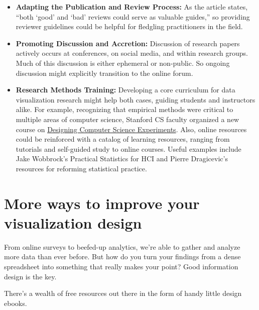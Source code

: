 \documentclass[]{book}
\providecommand{\tightlist}{%
  \setlength{\itemsep}{0pt}\setlength{\parskip}{0pt}}
\theoremstyle{definition}
\theoremstyle{definition}
\theoremstyle{definition}
\theoremstyle{remark}
\begin{document}
\begin{itemize}
\tightlist
\item
  \textbf{Adapting the Publication and Review Process:} As the article
  states, ``both `good' and `bad' reviews could serve as valuable
  guides,'' so providing reviewer guidelines could be helpful for
  fledgling practitioners in the field.
\item
  \textbf{Promoting Discussion and Accretion:} Discussion of research
  papers actively occurs at conferences, on social media, and within
  research groups. Much of this discussion is either ephemeral or
  non-public. So ongoing discussion might explicitly transition to the
  online forum.
\item
  \textbf{Research Methods Training:} Developing a core curriculum for
  data visualization research might help both cases, guiding students
  and instructors alike. For example, recognizing that empirical methods
  were critical to multiple areas of computer science, Stanford CS
  faculty organized a new course on
  \href{http://sing.stanford.edu/cs303-sp11/}{Designing Computer Science
  Experiments}. Also, online resources could be reinforced with a
  catalog of learning resources, ranging from tutorials and self-guided
  study to online courses. Useful examples include Jake Wobbrock's
  Practical Statistics for HCI and Pierre Dragicevic's resources for
  reforming statistical practice.
\end{itemize}

\section{More ways to improve your visualization
design}\label{more-ways-to-improve-your-visualization-design}

From online surveys to beefed-up analytics, we're able to gather and
analyze more data than ever before. But how do you turn your findings
from a dense spreadsheet into something that really makes your point?
Good information design is the key.

There's a wealth of free resources out there in the form of handy little
design ebooks.
\end{document}
